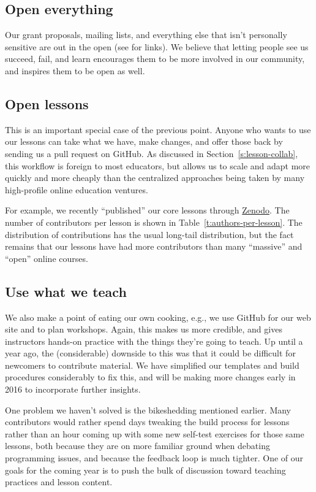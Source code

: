 \documentclass[10pt,a4paper,twocolumn]{article}
\begin{document}
\subsection{Open everything}

Our grant proposals, mailing lists, and everything else that isn't
personally sensitive are out in the open (see \cite{swcsite} for
links).  We believe that letting people see us succeed, fail, and
learn encourages them to be more involved in our community, and
inspires them to be open as well.

\subsection{Open lessons}

This is an important special case of the previous point. Anyone who
wants to use our lessons can take what we have, make changes, and
offer those back by sending us a pull request on GitHub. As discussed
in Section~\ref{s:lesson-collab}, this workflow is foreign to most
educators, but allows us to scale and adapt more quickly and more
cheaply than the centralized approaches being taken by many
high-profile online education ventures.

For example, we recently ``published'' our core lessons through
\href{https://zenodo.org/}{Zenodo}.  The number of contributors per
lesson is shown in Table~\ref{t:authors-per-lesson}.  The distribution
of contributions has the usual long-tail distribution, but the fact
remains that our lessons have had more contributors than many
``massive'' and ``open'' online courses.

\subsection{Use what we teach}

We also make a point of eating our own cooking, e.g., we use GitHub
for our web site and to plan workshops. Again, this makes us more
credible, and gives instructors hands-on practice with the things
they're going to teach.  Up until a year ago, the (considerable)
downside to this was that it could be difficult for newcomers to
contribute material.  We have simplified our templates and build
procedures considerably to fix this, and will be making more changes
early in 2016 to incorporate further insights.

One problem we haven't solved is the bikeshedding mentioned earlier.
Many contributors would rather spend days tweaking the build process
for lessons rather than an hour coming up with some new self-test
exercises for those same lessons, both because they are on more
familiar ground when debating programming issues, and because the
feedback loop is much tighter.  One of our goals for the coming year
is to push the bulk of discussion toward teaching practices and lesson
content.
\end{document}
